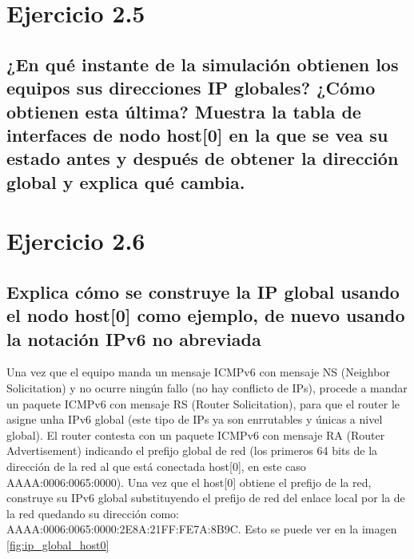 \section{Ejercicio 2.5}
\subsection{¿En qué instante de la simulación obtienen los equipos sus direcciones IP globales? ¿Cómo obtienen esta
última? Muestra la tabla de interfaces de nodo host[0] en la que se vea su estado antes y después de obtener la
dirección global y explica qué cambia.}

\section{Ejercicio 2.6}
\subsection{Explica cómo se construye la IP global usando el nodo host[0] como ejemplo, de nuevo usando la notación
IPv6 no abreviada}

Una vez que el equipo manda un mensaje ICMPv6 con mensaje NS (Neighbor Solicitation) y no ocurre ningún fallo (no hay conflicto de IPs), procede a mandar un paquete ICMPv6 con mensaje RS (Router Solicitation), para que el router le asigne unha IPv6 global (este tipo de IPs ya son enrrutables y únicas a nivel global). El router contesta con un paquete ICMPv6 con mensaje RA (Router Advertisement) indicando el prefijo global de red (los primeros 64 bits de la dirección de la red al que está conectada host[0], en este caso AAAA:0006:0065:0000). Una vez que el host[0] obtiene el prefijo de la red, construye su IPv6 global substituyendo el prefijo de red del enlace local por la de la red quedando su dirección como: AAAA:0006:0065:0000:2E8A:21FF:FE7A:8B9C. Esto se puede ver en la imagen \ref{fig:ip_global_host0}

